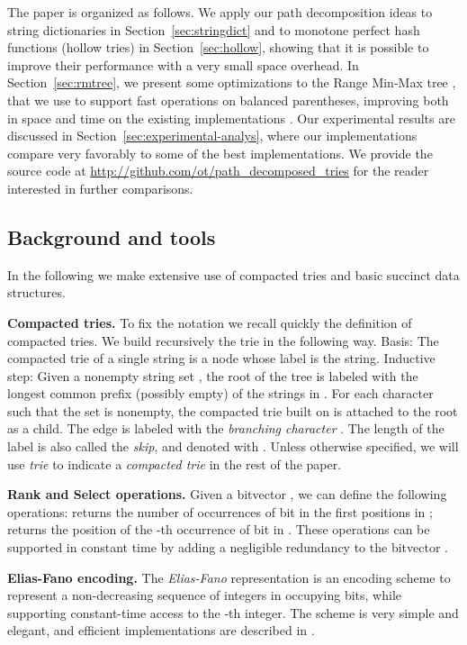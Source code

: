 \documentclass[a4paper,11pt]{article}
\newcommand{\ttlpar}[1]{\noindent\textbf{#1}}
\theoremstyle{nonumberplain}
\begin{document}
The paper is organized as follows. We apply our path decomposition ideas to string dictionaries in
Section~\ref{sec:stringdict} and to monotone perfect hash functions
(hollow tries) in Section~\ref{sec:hollow}, showing that it is
possible to improve their performance with a very small
space overhead. In Section~\ref{sec:rmtree}, we present some
optimizations to the Range Min-Max tree \cite{bpsoda10,bpalx10}, that we use
to support fast operations on balanced parentheses, improving
both in space and time on the existing
implementations \cite{bpalx10}. Our experimental results are discussed in
Section~\ref{sec:experimental-analys}, where our implementations compare very
favorably to some of the best implementations. We provide the source
code at \url{http://github.com/ot/path_decomposed_tries} for the
reader interested in further comparisons. 


\subsection{Background and tools}
\label{sub:background-tools}
In the following we make extensive use of compacted tries and basic
succinct data structures.


\ttlpar{Compacted tries.} 
To fix the notation we recall quickly the definition of compacted
tries. We build recursively the trie in the following way. Basis: The
compacted trie of a single string is a node whose label is the
string. Inductive step: Given a nonempty string set , the
root of the tree is labeled with the longest common prefix 
(possibly empty) of the strings in . For each character
 such that the set  is nonempty, the compacted trie built on
 is attached to the root as a child. The edge is
labeled with the \emph{branching character} .  The length of the
label  is also called the \emph{skip}, and denoted with
. Unless otherwise specified, we will use \emph{trie} to
indicate a \emph{compacted trie} in the rest of the paper.

\ttlpar{Rank and Select operations.}
Given a bitvector , we can define the following operations: 
 returns the number of occurrences of bit  in the first  positions in ;
 returns the position of the -th occurrence of bit 
in . These operations can be supported in constant time by adding a 
negligible redundancy to the bitvector \cite{Clark98,jacobson89}.

\ttlpar{Elias-Fano encoding.} 
The \emph{Elias-Fano} representation \cite{elias74,fano71} is an
encoding scheme to represent a non-decreasing sequence of  integers
in  occupying  bits, while supporting constant-time access to the -th
integer. 
The scheme is very simple and
elegant, and efficient implementations are described in
\cite{grossi05,sadaalx07,vigna08}.
\end{document}
